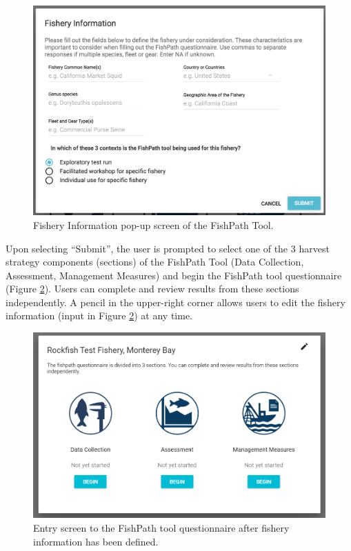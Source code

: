 \documentclass[
  11pt,
]{book}
\begin{document}
\begin{figure}

{\centering \includegraphics[width=0.95\linewidth]{images/fishery-info-screen} 

}

\caption{Fishery Information pop-up screen of the FishPath Tool.}\label{fig:fishery-info}
\end{figure}

Upon selecting ``Submit'', the user is prompted to select one of the 3 harvest strategy components (sections) of the FishPath Tool (Data Collection, Assessment, Management Measures) and begin the FishPath tool questionnaire (Figure \ref{fig:fishery-entry}). Users can complete and review results from these sections independently. A pencil in the upper-right corner allows users to edit the fishery information (input in Figure \ref{fig:fishery-entry}) at any time.

\begin{figure}

{\centering \includegraphics[width=0.95\linewidth]{images/fishery-entry-screen} 

}

\caption{Entry screen to the FishPath tool questionnaire after fishery information has been defined.}\label{fig:fishery-entry}
\end{figure}
\end{document}
